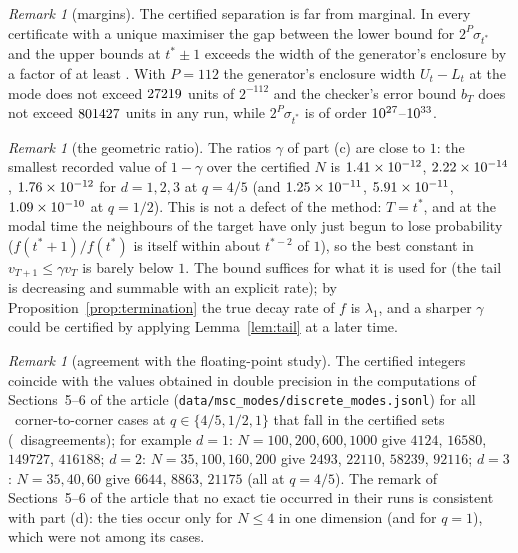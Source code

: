 \documentclass[11pt,a4paper]{article}
\theoremstyle{definition}
\theoremstyle{remark}
\newtheorem{remark}[theorem]{Remark}
\begin{document}
\begin{remark}[margins]
The certified separation is far from marginal. In every certificate with a unique maximiser the gap between the lower bound for $2^P\sigma_{t^*}$ and the upper bounds at $t^*\pm1$ exceeds the width of the generator's enclosure by a factor of at least \MinMargin. With $P=112$ the generator's enclosure width $U_t-L_t$ at the mode does not exceed $27219$ units of $2^{-112}$ and the checker's error bound $b_T$ does not exceed $801427$ units in any run, while $2^P\sigma_{t^*}$ is of order $10^{27}$--$10^{33}$.
\end{remark}

\begin{remark}[the geometric ratio]
The ratios $\gamma$ of part (c) are close to $1$: the smallest recorded value of $1-\gamma$ over the certified $N$ is $1.41\times10^{-12}$, $2.22\times10^{-14}$, $1.76\times10^{-12}$ for $d=1,2,3$ at $q=4/5$ (and $1.25\times10^{-11}$, $5.91\times10^{-11}$, $1.09\times10^{-10}$ at $q=1/2$). This is not a defect of the method: $T=t^*$, and at the modal time the neighbours of the target have only just begun to lose probability ($f(t^*+1)/f(t^*)$ is itself within about $t^{*-2}$ of $1$), so the best constant in $v_{T+1}\le\gamma v_T$ is barely below $1$. The bound suffices for what it is used for (the tail is decreasing and summable with an explicit rate); by Proposition~\ref{prop:termination} the true decay rate of $f$ is $\lambda_1$, and a sharper $\gamma$ could be certified by applying Lemma~\ref{lem:tail} at a later time.
\end{remark}

\begin{remark}[agreement with the floating-point study]
The certified integers coincide with the values obtained in double precision in the computations of Sections~5--6 of the article (\texttt{data/msc\_modes/discrete\_modes.jsonl}) for all \FloatStudyAgree\ corner-to-corner cases at $q\in\{4/5,1/2,1\}$ that fall in the certified sets (\FloatStudyDisagree\ disagreements); for example $d=1$: $N=100,200,600,1000$ give $4124$, $16580$, $149727$, $416188$; $d=2$: $N=35,100,160,200$ give $2493$, $22110$, $58239$, $92116$; $d=3$: $N=35,40,60$ give $6644$, $8863$, $21175$ (all at $q=4/5$). The remark of Sections~5--6 of the article that no exact tie occurred in their runs is consistent with part (d): the ties occur only for $N\le4$ in one dimension (and for $q=1$), which were not among its cases.
\end{remark}
\end{document}
